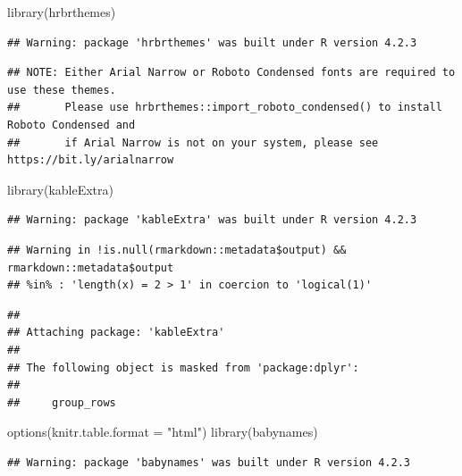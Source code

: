 \documentclass[
]{article}
\newenvironment{Shaded}{\begin{snugshade}}{\end{snugshade}}
\newcommand{\AttributeTok}[1]{\textcolor[rgb]{0.77,0.63,0.00}{#1}}
\newcommand{\FunctionTok}[1]{\textcolor[rgb]{0.00,0.00,0.00}{#1}}
\newcommand{\NormalTok}[1]{#1}
\newcommand{\StringTok}[1]{\textcolor[rgb]{0.31,0.60,0.02}{#1}}
\begin{document}
\begin{Shaded}
\begin{Highlighting}[]
\FunctionTok{library}\NormalTok{(hrbrthemes)}
\end{Highlighting}
\end{Shaded}

\begin{verbatim}
## Warning: package 'hrbrthemes' was built under R version 4.2.3
\end{verbatim}

\begin{verbatim}
## NOTE: Either Arial Narrow or Roboto Condensed fonts are required to use these themes.
##       Please use hrbrthemes::import_roboto_condensed() to install Roboto Condensed and
##       if Arial Narrow is not on your system, please see https://bit.ly/arialnarrow
\end{verbatim}

\begin{Shaded}
\begin{Highlighting}[]
\FunctionTok{library}\NormalTok{(kableExtra)}
\end{Highlighting}
\end{Shaded}

\begin{verbatim}
## Warning: package 'kableExtra' was built under R version 4.2.3
\end{verbatim}

\begin{verbatim}
## Warning in !is.null(rmarkdown::metadata$output) && rmarkdown::metadata$output
## %in% : 'length(x) = 2 > 1' in coercion to 'logical(1)'
\end{verbatim}

\begin{verbatim}
## 
## Attaching package: 'kableExtra'
## 
## The following object is masked from 'package:dplyr':
## 
##     group_rows
\end{verbatim}

\begin{Shaded}
\begin{Highlighting}[]
\FunctionTok{options}\NormalTok{(}\AttributeTok{knitr.table.format =} \StringTok{"html"}\NormalTok{)}
\FunctionTok{library}\NormalTok{(babynames)}
\end{Highlighting}
\end{Shaded}

\begin{verbatim}
## Warning: package 'babynames' was built under R version 4.2.3
\end{verbatim}
\end{document}
